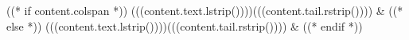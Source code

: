 ((* if content.colspan *))
 (((content.text.lstrip())))(((content.tail.rstrip()))) &
((* else *))
(((content.text.lstrip())))(((content.tail.rstrip()))) &
((* endif *))

